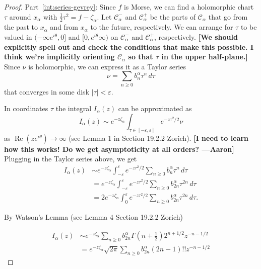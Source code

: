 \documentclass[11pt,a4paper,twoside,leqno,noamsfonts]{amsart}
\numberwithin{equation}{section}
\begin{document}
\begin{proof}
Part~\eqref{int:series-gevrey}: Since $f$ is Morse, we can find a holomorphic chart $\tau$ around $x_\alpha$ with $\tfrac{1}{2} \tau^2 = f - \zeta_\alpha$. Let $\mathcal{C}^-_\alpha$ and $\mathcal{C}^+_\alpha$ be the parts of $\mathcal{C}_\alpha$ that go from the past to $x_\alpha$ and from $x_\alpha$ to the future, respectively. We can arrange for $\tau$ to be valued in $(-\infty e^{i\theta}, 0]$ and $[0, e^{i\theta}\infty)$ on $\mathcal{C}^-_\alpha$ and $\mathcal{C}^+_\alpha$, respectively. \textbf{[We should explicitly spell out and check the conditions that make this possible. I think we're implicitly orienting $\mathcal{C}_\alpha$ so that $\tau$ in the upper half-plane.]} Since $\nu$ is holomorphic, we can express it as a Taylor series
\[ \nu = \sum_{n \ge 0} b_n^\alpha \tau^n\,d\tau \]
that converges in some disk $|\tau| < \varepsilon$.


In coordinates $\tau $ the integral $I_\alpha(z)$ can be approximated as 
\[ I_\alpha(z) \sim  e^{-z\zeta_\alpha}\int_{\tau \in [-\varepsilon, \varepsilon]} e^{-z\tau^2/2} \nu \]
as $\operatorname{Re}(ze^{i\theta}) \to \infty$ (see Lemma 1 in Section 19.2.2  Zorich). \textbf{[I need to learn how this works! Do we get asymptoticity at all orders? ---Aaron]} Plugging in the Taylor series above, we get
\begin{align*}
 I_\alpha(z) & \sim e^{-z\zeta_\alpha}\int_{-\varepsilon}^\varepsilon e^{-z\tau^2/2} \sum_{n \ge 0} b_n^\alpha \tau^n\,d\tau \\
& = e^{-z\zeta_\alpha}\int_{-\varepsilon}^\varepsilon e^{-z\tau^2/2} \sum_{n \ge 0} b_{2n}^\alpha \tau^{2n}\,d\tau\\
& = 2e^{-z\zeta_\alpha}\int_{0}^\varepsilon e^{-z\tau^2/2} \sum_{n \ge 0} b_{2n}^\alpha \tau^{2n}\,d\tau.
\end{align*}


By Watson's Lemma (see Lemma 4 Section 19.2.2 Zorich)

\begin{align*}
I_\alpha(z) &\sim e^{-z\zeta_\alpha}\sum_{n \ge 0} b_{2n}^\alpha \Gamma\left(n+\tfrac{1}{2}\right)2^{n+1/2}z^{-n-1/2}\\
&= e^{-z\zeta_\alpha}\sqrt{2\pi}\sum_{n \ge 0} b_{2n}^\alpha (2n-1)!!z^{-n-1/2}
\end{align*}




\end{proof}
\end{document}

